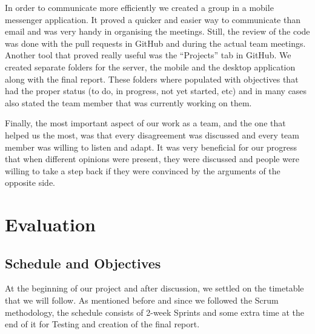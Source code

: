 \documentclass[11pt]{article}
\begin{document}
In order to communicate more efficiently we created a group in a mobile messenger application. It proved a quicker and easier way to communicate than email and was very handy in organising the meetings. Still, the review of the code was done with the pull requests in GitHub and during the actual team meetings. Another tool that proved really useful was the “Projects” tab in GitHub. We created separate folders for the server, the mobile and the desktop application along with the final report. These folders where populated with objectives that had the proper status (to do, in progress, not yet started, etc) and in many cases also stated the team member that was currently working on them.

Finally, the most important aspect of our work as a team, and the one that helped us the most, was that every disagreement was discussed and every team member was willing to listen and adapt. It was very beneficial for our progress that when different opinions were present, they were discussed and people were willing to take a step back if they were convinced by the arguments of the opposite side.


\section{Evaluation}

\subsection{Schedule and Objectives}

At the beginning of our project and after discussion, we settled on the timetable that we will follow. As mentioned before and since we followed the Scrum methodology, the schedule consists of 2-week Sprints and some extra time at the end of it for Testing and creation of the final report.

\begin{table}[H]
	\noindent{}
	\caption{Project Timetable}
	\label{tab:timetable}
\end{table}
\end{document}
